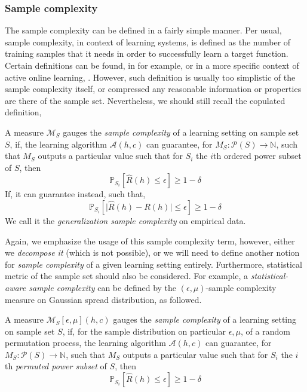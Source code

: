 \subsubsection{Sample complexity}

The sample complexity can be defined in a fairly simple manner. Per usual, sample complexity, in context of learning systems, is defined as the number of training samples that it needs in order to successfully learn a target function. Certain definitions can be found, in for example, \cite{huang2025samplecomplexityrepresentationability,wegel2025samplecomplexitysemisupervisedmultiobjective,Mei2022TowardsBridging} or in a more specific context of active online learning, \cite{Balcan2010TrueSampleComplexity}.  However, such definition is usually too simplistic of the sample complexity itself, or compressed any reasonable information or properties are there of the sample set. Nevertheless, we should still recall the copulated definition, 
\begin{definition}
  A measure $\mathcal{M}_{S}$ gauges the \textit{sample complexity} of a learning setting on sample set $S$, if, the learning algorithm $\mathcal{A}(h,c)$ can guarantee, for $M_{S}:\mathcal{P}(S)\to\mathbb{N}$, such that $M_{S}$ outputs a particular value such that for $S_{i}$ the $i$th ordered power subset of $S$, then
  \begin{equation}
    \mathbb{P}_{S_{i}} \left[\hat{R}(h)\leq \epsilon\right] \geq 1 - \delta
  \end{equation}
  If, it can guarantee instead, such that, 
  \begin{equation}
    \mathbb{P}_{S_{i}} \left[\lvert \hat{R}(h) - R(h) \rvert\leq \epsilon\right] \geq 1 - \delta
  \end{equation}
  We call it the \textit{generalization sample complexity} on empirical data. 
\end{definition}
Again, we emphasize the usage of this sample complexity term, however, either we \textit{decompose it} (which is not possible), or we will need to define another notion for \textit{sample complexity} of a given learning setting entirely. Furthermore, statistical metric of the sample set should also be considered. For example, a \textit{statistical-aware sample complexity} can be defined by the $(\epsilon,\mu)$-sample complexity measure on Gaussian spread distribution, as followed. 
\begin{definition}
  A measure $\mathcal{M}_{S}[\epsilon,\mu](h,c)$ gauges the \textit{sample complexity} of a learning setting on sample set $S$, if, for the sample distribution on particular $\epsilon,\mu$, of a random permutation process, the learning algorithm $\mathcal{A}(h,c)$ can guarantee, for $M_{S}:\mathcal{P}(S)\to\mathbb{N}$, such that $M_{S}$ outputs a particular value such that for $S_{i}$ the $i$th \textit{permuted power subset} of $S$, then
  \begin{equation}
    \mathbb{P}_{S_{i}} \left[\hat{R}(h)\leq \epsilon\right] \geq 1 - \delta
  \end{equation}
\end{definition}
